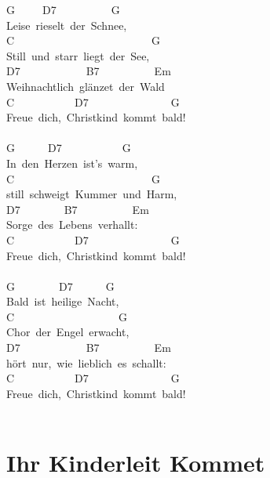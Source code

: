 \documentclass[]{book}
\let\stdsection\section
\renewcommand\section{\clearpage\stdsection}
\begin{document}
G~~~~~D7~~~~~~~~~~G\\
Leise~rieselt~der~Schnee,\\
C~~~~~~~~~~~~~~~~~~~~~~~~~G\\
Still~und~starr~liegt~der~See,\\
D7~~~~~~~~~~~~B7~~~~~~~~~~Em\\
Weihnachtlich~glänzet~der~Wald\\
C~~~~~~~~~~~D7~~~~~~~~~~~~~~~G\\
Freue~dich,~Christkind~kommt~bald!\\
~\\
G~~~~~~D7~~~~~~~~~~~G\\
In~den~Herzen~ist's~warm,\\
C~~~~~~~~~~~~~~~~~~~~~~~~~G\\
still~schweigt~Kummer~und~Harm,\\
D7~~~~~~~~B7~~~~~~~~~~Em\\
Sorge~des~Lebens~verhallt:\\
C~~~~~~~~~~~D7~~~~~~~~~~~~~~~G\\
Freue~dich,~Christkind~kommt~bald!\\
~\\
G~~~~~~~~D7~~~~~~G\\
Bald~ist~heilige~Nacht,\\
C~~~~~~~~~~~~~~~~~~~G\\
Chor~der~Engel~erwacht,\\
D7~~~~~~~~~~~~B7~~~~~~~~~~Em\\
hört~nur,~wie~lieblich~es~schallt:\\
C~~~~~~~~~~~D7~~~~~~~~~~~~~~~G\\
Freue~dich,~Christkind~kommt~bald!\\
~\\

\hypertarget{ihr-kinderleit-kommet}{%
\section{Ihr Kinderleit Kommet}\label{ihr-kinderleit-kommet}}
\end{document}
